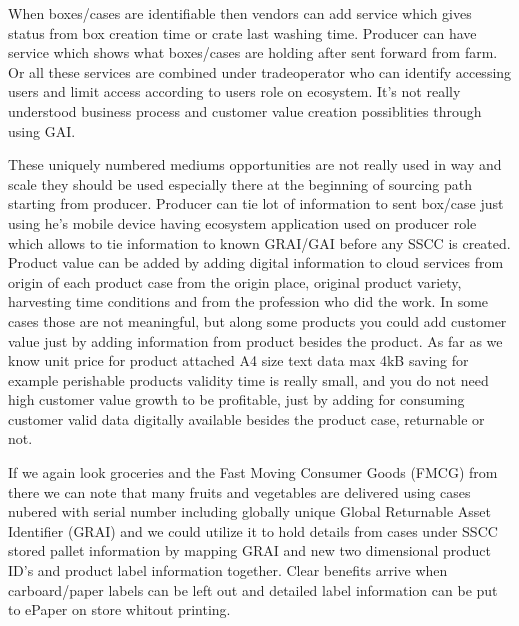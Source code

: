 When boxes/cases are identifiable then vendors can add service which gives
status from box creation time or crate last washing time. Producer can have
service which shows what boxes/cases are holding after sent forward from farm.
Or all these services are combined under tradeoperator who can identify
accessing users and limit access according to users role on ecosystem. It's not
really understood business process and customer value creation possiblities
through using GAI.

These uniquely numbered mediums opportunities are not really used in way and
scale they should be used especially there at the beginning of sourcing path
starting from producer. Producer can tie lot of information to sent box/case
just using he's mobile device having ecosystem application used on producer
role which allows to tie information to known GRAI/GAI before any SSCC is
created. Product value can be added by adding digital information to cloud
services from origin of each product case from the origin place, original
product variety, harvesting time conditions and from the profession who did
the work. In some cases those are not meaningful, but along some products you
could add customer value just by adding information from product besides the
product. As far as we know unit price for product attached A4 size text data
max 4kB saving for example perishable products validity time is really small,
and you do not need high customer value growth to be profitable, just by
adding for consuming customer valid data digitally available besides the
product case, returnable or not.

If we again look groceries and the Fast Moving Consumer Goods (FMCG) from there
we can note that many fruits and vegetables are delivered using cases nubered
with serial number including globally unique Global Returnable Asset Identifier
(GRAI) and we could utilize it to hold details from cases under SSCC stored
pallet information by mapping GRAI and new two dimensional product ID's and
product label information together. Clear benefits arrive when carboard/paper
labels can be left out and detailed label information can be put to ePaper on
store whitout printing.

